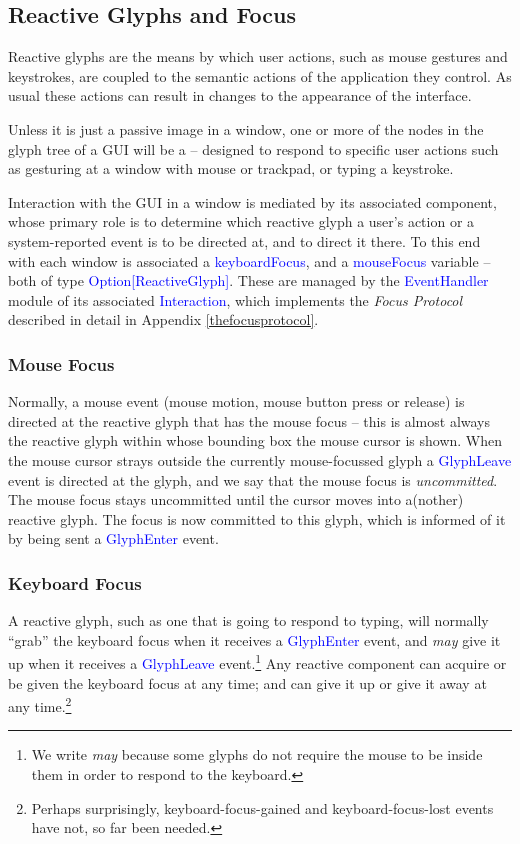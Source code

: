 \documentclass[12pt,a4paper]{article}
\def\Scala#1{\textcolor{blue}{\textsf{#1}}}
\def\SS#1{\subsection{#1}}
\def\SSS#1{\subsubsection*{#1}}
\begin{document}
\SS{Reactive Glyphs and Focus}

Reactive glyphs are the means by which user actions, such as mouse
gestures and keystrokes, are coupled to the semantic actions of the
application they control. As usual these actions can 
result in changes to the appearance of the interface.

Unless it is just a passive image in a window, one or more of the
nodes in the glyph tree of a GUI will be a 
-- designed to respond to specific user actions such as gesturing
at a window with mouse or trackpad, or typing a keystroke.

Interaction with the GUI in a window is mediated by its associated
 component, whose primary role is to determine
which reactive glyph a user's action or a system-reported event is
to be directed at, and to direct it there. To this end 
with each window is associated a \Scala{keyboardFocus}, and a
\Scala{mouseFocus}  variable -- both of type
\Scala{Option[ReactiveGlyph]}. These are managed by the
\Scala{EventHandler} module of its associated \Scala{Interaction},
which implements the \textit{Focus Protocol} described
in detail in Appendix \ref{thefocusprotocol}.

\begin{comment}
\footnote{A window's \Scala{RootGlyph}
also manages the ancillary glyph trees associated with the implementation
of dialogues, menus, and transient decorations. The management of ancillaries
lends an element of complexity to the protocol implementation, but
a detailed discussion is not needed here.}

\footnote{\textit{via} the standard
reactive \Scala{RootGlyph} component that contains every
GUI tree as its single branch.} 
\end{comment}

\SSS{Mouse Focus}
Normally, a mouse event (mouse motion, mouse button press or release)
is directed at the reactive glyph that has the mouse focus -- this
is almost always the reactive glyph within whose bounding box the mouse
cursor is shown. When the mouse cursor strays outside the currently
mouse-focussed glyph a \Scala{GlyphLeave} event is directed
at the glyph, and we say that the mouse focus is 
\textit{uncommitted}.  The mouse focus
stays uncommitted until the cursor moves into a(nother) reactive glyph.
The focus is now committed to this glyph, which is informed of it
by being sent a \Scala{GlyphEnter} event.

\SSS{Keyboard Focus}
A reactive glyph, such as  one that is going to respond to typing,
will normally ``grab'' the keyboard focus when it receives a
\Scala{GlyphEnter} event, and \textit{may} give it up when it
receives a \Scala{GlyphLeave} event.\footnote{We write \textit{may}
because some glyphs do not require the mouse to be inside them in
order to respond to the keyboard.} Any reactive component can acquire
or be given the keyboard focus at any time; and can give it up or give
it away at any time.\footnote{Perhaps surprisingly, keyboard-focus-gained and keyboard-focus-lost events
have not, so far been needed.}
\end{document}
